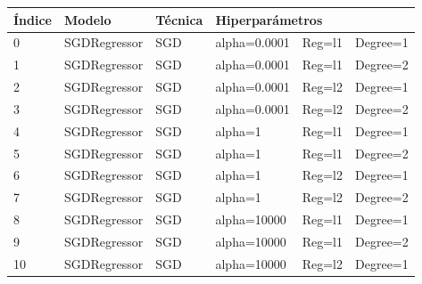 \documentclass[a4paper,11pt]{article}
\begin{document}
\begin{table}[h]
\begin{tabular}{|l|l|l|l|l|l|}
\hline
Índice & Modelo          & Técnica       & \multicolumn{3}{l|}{Hiperparámetros}          \\ \hline
0      & SGDRegressor    & SGD           & alpha=0.0001        & Reg=l1      & Degree=1  \\ \hline
1      & SGDRegressor    & SGD           & alpha=0.0001        & Reg=l1      & Degree=2  \\ \hline
2      & SGDRegressor    & SGD           & alpha=0.0001        & Reg=l2      & Degree=1  \\ \hline
3      & SGDRegressor    & SGD           & alpha=0.0001        & Reg=l2      & Degree=2  \\ \hline
4      & SGDRegressor    & SGD           & alpha=1             & Reg=l1      & Degree=1  \\ \hline
5      & SGDRegressor    & SGD           & alpha=1             & Reg=l1      & Degree=2  \\ \hline
6      & SGDRegressor    & SGD           & alpha=1             & Reg=l2      & Degree=1  \\ \hline
7      & SGDRegressor    & SGD           & alpha=1             & Reg=l2      & Degree=2  \\ \hline
8      & SGDRegressor    & SGD           & alpha=10000         & Reg=l1      & Degree=1  \\ \hline
9      & SGDRegressor    & SGD           & alpha=10000         & Reg=l1      & Degree=2  \\ \hline
10     & SGDRegressor    & SGD           & alpha=10000         & Reg=l2      & Degree=1  \\ \hline


\end{tabular}
\end{table}

\newpage
\end{document}
